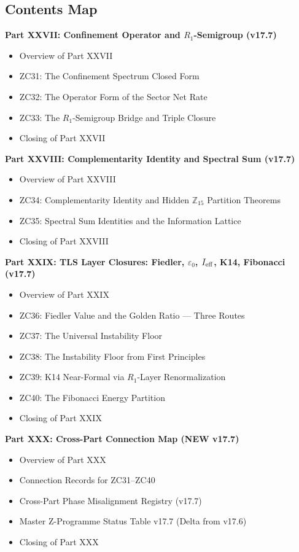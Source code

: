 \documentclass[11pt, a4paper]{article}
\newcommand{\Ztf}{\mathbb{Z}_{15}}
\begin{document}
\subsection*{Contents Map}

\begin{contentsbox}[title={Part E --- Part and Section Headers}]
\textbf{Part XXVII: Confinement Operator and $R_1$-Semigroup (v17.7)}
\begin{itemize}[noitemsep,leftmargin=1.5em]
  \item Overview of Part XXVII
  \item ZC31: The Confinement Spectrum Closed Form
  \item ZC32: The Operator Form of the Sector Net Rate
  \item ZC33: The $R_1$-Semigroup Bridge and Triple Closure
  \item Closing of Part XXVII
\end{itemize}

\textbf{Part XXVIII: Complementarity Identity and Spectral Sum (v17.7)}
\begin{itemize}[noitemsep,leftmargin=1.5em]
  \item Overview of Part XXVIII
  \item ZC34: Complementarity Identity and Hidden $\Ztf$ Partition Theorems
  \item ZC35: Spectral Sum Identities and the Information Lattice
  \item Closing of Part XXVIII
\end{itemize}

\textbf{Part XXIX: TLS Layer Closures: Fiedler, $\varepsilon_0$, $I_{\rm eff}$, K14, Fibonacci (v17.7)}
\begin{itemize}[noitemsep,leftmargin=1.5em]
  \item Overview of Part XXIX
  \item ZC36: Fiedler Value and the Golden Ratio --- Three Routes
  \item ZC37: The Universal Instability Floor
  \item ZC38: The Instability Floor from First Principles
  \item ZC39: K14 Near-Formal via $R_1$-Layer Renormalization
  \item ZC40: The Fibonacci Energy Partition
  \item Closing of Part XXIX
\end{itemize}

\textbf{Part XXX: Cross-Part Connection Map (NEW v17.7)}
\begin{itemize}[noitemsep,leftmargin=1.5em]
  \item Overview of Part XXX
  \item Connection Records for ZC31--ZC40
  \item Cross-Part Phase Misalignment Registry (v17.7)
  \item Master Z-Programme Status Table v17.7 (Delta from v17.6)
  \item Closing of Part XXX
\end{itemize}
\end{contentsbox}
\end{document}
